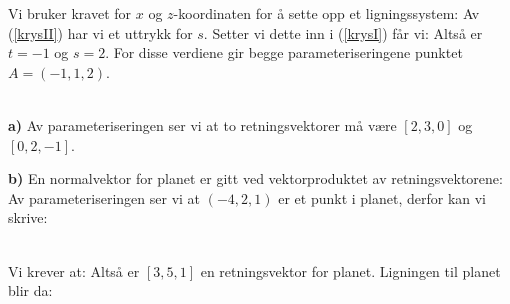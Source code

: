 




 

Vi bruker kravet for $ x $ og $ z $-koordinaten for å sette opp et ligningssystem:
Av (\ref{krysII}) har vi et uttrykk for $ s $. Setter vi dette inn i (\ref{krysI}) får vi:
Altså er $ t=-1 $ og $ s=2 $. For disse verdiene gir begge parameteriseringene punktet $ A=(-1, 1, 2) $.

 

 

 

\\
\textbf{a)} Av parameteriseringen ser vi at to retningsvektorer må være $ [2, 3, 0] $ og $ [0, 2, -1] $. 

\textbf{b)} En normalvektor for planet er gitt ved vektorproduktet av retningsvektorene:
Av parameteriseringen ser vi at $ (-4, 2, 1) $ er et punkt i planet, derfor kan vi skrive:

 \\
Vi krever at:\vs
{}
Altså er $ [3, 5, 1] $ en retningsvektor for planet. Ligningen til planet blir da:

